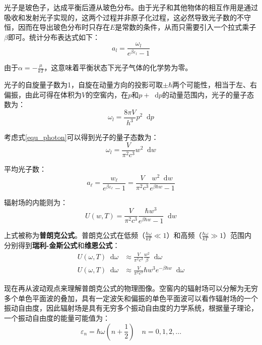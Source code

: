 \documentclass[UTF8]{ctexart}
\newcommand*{\dif}{\mathop{}\!\mathrm{d}}
\begin{document}
	光子是玻色子，达成平衡后遵从玻色分布。由于光子和其他物体的相互作用是通过吸收和发射光子实现的，这两个过程并非原子化过程，这必然导致光子数的不守恒，因而在导出玻色分布时只存在$ E $是常数的条件，从而只需要引入一个拉式乘子$ \beta $即可。统计分布表达式如下：
	\begin{equation}
		a_{l}=\frac{\omega_{l}}{e^{\beta \varepsilon_{l}}-1}
	\end{equation}
	
\noindent 由于$ \alpha=-\frac{\mu}{k T} $，这意味着平衡状态下光子气体的化学势为零。
	
	光子的自旋量子数为1，自旋在动量方向的投影可取$ \pm \hbar $两个可能性，相当于左、右偏振，由此可得在体积为$ V $的空窖内，在$ p $和$ p+\dif p $的动量范围内，光子的量子态数为：
	\begin{equation}
		\omega_{l}=\frac{8 \pi V}{h^{3}} p^{2} \dif p
	\end{equation}
	
\noindent 考虑式\ref{equ_photon}可以得到光子的量子态数为：
\begin{equation}
	\omega_{l}=\frac{V}{\pi^{2} c^{3}} w^{2} \dif w
\end{equation}

\noindent 平均光子数：
\begin{equation}
	a_{\ell}=\frac{w_{\ell}}{e^{\beta \varepsilon_{\ell}}-1}=\frac{V}{\pi^{2} c^{3}} \frac{w^{2} \dif w}{e^{\beta \hbar w}-1}
\end{equation}

\noindent 辐射场的内能则为：
\begin{equation}
	U(w, T)=\frac{V}{\pi^{2} c^{3}} \frac{\hbar w^{3}}{e^{\beta \hbar w}-1} \dif w \label{equ_photon_U}
\end{equation}

	上式被称为\textbf{普朗克公式}。普朗克公式在低频（$ \frac{\hbar \omega}{k T}\ll 1 $）和高频（$ \frac{\hbar \omega}{k T}\gg 1 $）范围内分别得到\textbf{瑞利-金斯公式}和\textbf{维恩公式}：
	\begin{equation}
		\begin{aligned}
		U(\omega, T) \dif \omega &\approx \frac{V}{\pi^{2} c^{3}} \frac{w^{2}}{\beta} \dif \omega\\
		U(\omega, T) \dif \omega &\approx \frac{V}{\pi^{2} c^{3}} \hbar w^{3} e^{-\beta \hbar w} \dif \omega 
		\end{aligned}
	\end{equation}
	
	现在再从波动观点来理解普朗克公式的物理图像。空窖内的辐射场可以分解为无穷多个单色平面波的叠加，具有一定波矢和偏振的单色平面波可以看作辐射场的一个振动自由度，因此辐射场是具有无穷多个振动自由度的力学系统，根据量子理论，一个振动自由度的能量可能值为：
	\begin{equation}
		\varepsilon_{n}=\hbar \omega \left(n+\frac{1}{2}\right) \quad n=0,1,2,...
	\end{equation}
	
\end{document}
